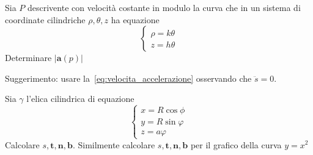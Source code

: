 \begin{eser}
    Sia \(P\) descrivente con velocità costante in modulo la curva che in un
    sistema di coordinate cilindriche \(\rho, \theta, z\) ha equazione
    \[
      \begin{cases}
          \rho = k \theta \\
          z = h \theta
      \end{cases}
    \]
    Determinare \(|\mathbf{a} {(p)}|\) 
    \tcblower

    Suggerimento: usare la~\eqref{eq:velocita_accelerazione} osservando che \(\ddot{s} = 0\).  
\end{eser}

\begin{eser}
Sia \(\gamma\) l'elica cilindrica di equazione
\[
  \begin{cases}
      x = R \cos\phi \\
      y = R\sin\varphi \\
      z = a \varphi 
  \end{cases}
\]
Calcolare \(s, \mathbf{t}, \mathbf{n} , \mathbf{b} \). Similmente calcolare \(s,
\mathbf{t} , \mathbf{n} , \mathbf{b}\) per il grafico della curva \(y = x^2\) 
\end{eser}

